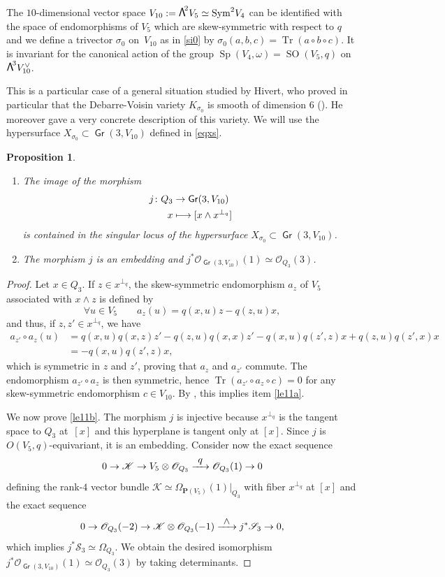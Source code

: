 \documentclass[JEP,XML,SOM,Unicode, NoEqCountersInSection,NoFloatCountersInSection]{cedram}
\let\mathcal\mathscr
\newenvironment{enumeratea}
{\bgroup\def\theenumi{\alph{enumi}}\def\theenumii{\arabic{enumii}}\begin{enumerate}}
{\end{enumerate}\egroup}
\newcommand\mto{\mathchoice{\longmapsto}{\mapsto}{\mapsto}{\mapsto}}
\newcommand\To[1]{\mathchoice{\xrightarrow{\textstyle\kern4pt#1\kern3pt}}{\stackrel{#1}{\longrightarrow}}{}{}}
\newtheorem{prop}[lemm]{Proposition}
\theoremstyle{definition}
\renewcommand\P{{\mathbf P}}\let\PP\P
\newcommand\cK{\mathcal{K}}
\newcommand\cO{\mathcal{O}}\let\OO\cO
\newcommand\cS{\mathcal{S}}\let\soustauto\cS
\DeclareMathOperator{\Gr}{\mathsf{Gr}}
\let\isom\simeq
\let\cong\simeq
\let\dual\vee
\DeclareMathOperator{\SO}{SO}
\DeclareMathOperator{\Sp}{Sp}
\DeclareMathOperator{\Sym}{Sym}
\DeclareMathOperator{\Tr}{Tr}
\newcommand\bw[1]{{\hbox{\large$\mathsf{\Lambda}$}^{\!#1}}}
\newcommand\Qtrois{{Q_3}}
\begin{document}
The $10$-dimensional vector space
$V_{10}:=\bw2V_5\cong \Sym^2\!V_4$
can be identified with the space of endomorphisms of $V_5$ which are skew-symmetric with respect to $q$ and we define
a trivector $\sigma_0$ on~$ V_{10}$ as in \eqref{si0} by
$\sigma_0(a,b,c)=\Tr(a\circ b\circ c)
$. It is invariant for the canonical action of the group $\Sp(V_4,\omega) =\SO(V_5,q)$ on $\bw3V_{10}^\dual $.

This is a particular case of a general situation studied by Hivert, who proved in particular that the Debarre-Voisin variety
$K_{\sigma_0}$
is smooth of dimension 6 (\cite[Def.\,1.2 \& Th.\,4.1]{hivert}). He moreover gave a very concrete description of this variety. We will use the hypersurface $X_{\sigma_0}\subset \Gr(3,V_{10})$ defined in \eqref{eqxs}.

\skpt
\begin{prop} \label{le11}
\begin{enumeratea}
\item\label{le11a}
The image of the morphism
\begin{align*}
j\colon \Qtrois&\to \Gr(3,V_{10})\\
x&\mto[ x\wedge x^{\perp_q}]
\end{align*}
is contained in the singular locus of the hypersurface $X_{\sigma_0}\subset \Gr(3,V_{10})$.

\item\label{le11b}
The morphism $j$ is an embedding and $j^*\cO_{\Gr(3,V_{10})}(1)\isom \cO_{\Qtrois}(3)$.
\end{enumeratea}
\end{prop}

\begin{proof} Let $x\in \Qtrois$. If $z\in x^{\perp_q}$, the skew-symmetric endomorphism $a_z $ of $V_5$ associated with $x\wedge z$ is defined by
\[
\forall u\in V_5\qquad a_z(u)=q(x,u)z-q(z,u)x,
\]
and thus, if $z,z'\in x^{\perp_q}$, we have
\begin{align*}
a_{z'}\circ a_z (u)&=q(x,u)q(x,z)z'-q(z,u)q(x,x)z'-q(x,u)q(z',z )x+q(z,u)q(z',x)x\\
&=-q(x,u)q(z',z )x,
\end{align*}
which is symmetric in $z$ and $z'$,
proving that $ a_z$ and $ a_{z'}$ commute. The endomorphism
$ a_{z'}\circ a_z$ is then symmetric, hence $\Tr( a_{z'}\circ a_z\circ c)=0$ for any skew-symmetric endomorphism $c\in V_{10}$.
By \cite[Prop.\,3.1]{devo}, this implies item \eqref{le11a}.

We now prove \eqref{le11b}. The morphism $j$ is injective because $x^{\perp_q}$ is the tangent space to $Q_3$ at~$[x]$ and this hyperplane is tangent only at $[x]$. Since $j$ is $O(V_5,q)$-equivariant, it is an embedding. Consider now the exact sequence
\[\label{eqprem2611}
0 \to \cK \to V_5\otimes \cO_{\Qtrois}\To{q} \cO_{\Qtrois}(1)\to 0
\]
defining the rank-$4$ vector bundle $\cK \isom\Omega_{\P(V_5)}(1)\vert_\Qtrois$ with fiber $x^{\perp_q}$ at $[x]$ and the exact sequence
\[\label{eqdeux2611}
0\to \cO_{\Qtrois}(-2) \to \cK\otimes \cO_{\Qtrois}(-1)\To{\wedge} j^*\cS_3\to 0
,\]
which implies $j^*\cS_3\isom \Omega_\Qtrois$. We obtain the desired isomorphism $j^*\cO_{\Gr(3,V_{10})}(1)\isom \cO_{\Qtrois}(3)$ by taking determinants.
\end{proof}
\end{document}

